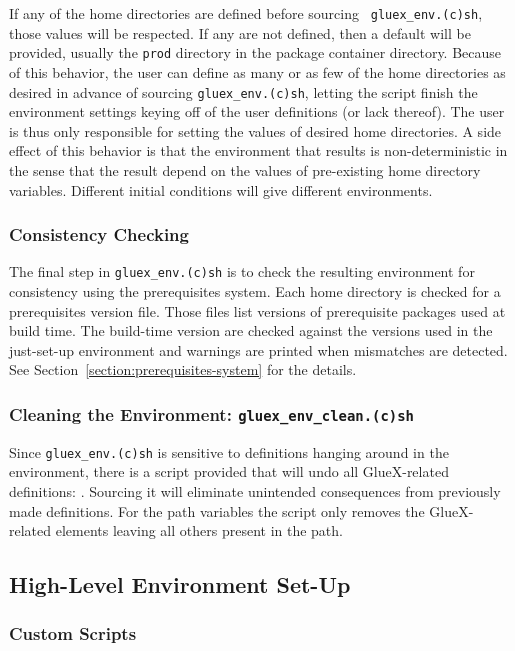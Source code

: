 \documentclass[12pt]{article}
\begin{document}
If any of the home directories are defined before sourcing {\tt
  gluex\_env.(c)sh}, those values will be respected. If any are not
defined, then a default will be provided, usually the {\tt prod}
directory in the package container directory. Because of this
behavior, the user can define as many or as few of the home
directories as desired in advance of sourcing {\tt gluex\_env.(c)sh},
letting the script finish the environment settings keying off of the
user definitions (or lack thereof). The user is thus only responsible
for setting the values of desired home directories. A side effect of
this behavior is that the environment that results is
non-deterministic in the sense that the result depend on the values
of pre-existing home directory variables. Different initial conditions
will give different environments.

\subsubsection{Consistency Checking}

The final step in {\tt gluex\_env.(c)sh} is to check the resulting
environment for consistency using the prerequisites system. Each home
directory is checked for a prerequisites version file. Those files
list versions of prerequisite packages used at build time. The
build-time version are checked against the versions used in the
just-set-up environment and warnings are printed when mismatches are
detected. See Section~\ref{section:prerequisites-system} for the
details.

\subsubsection{Cleaning the Environment: {\tt gluex\_env\_clean.(c)sh}}

Since {\tt gluex\_env.(c)sh} is sensitive to definitions hanging
around in the environment, there is a script provided that will undo
all GlueX-related definitions: . Sourcing
it will eliminate unintended consequences from previously made
definitions. For the path variables the script only removes the
GlueX-related elements leaving all others present in the path.

\subsection{High-Level Environment Set-Up}

\subsubsection{Custom Scripts}\label{section:custom-scripts}
\end{document}

